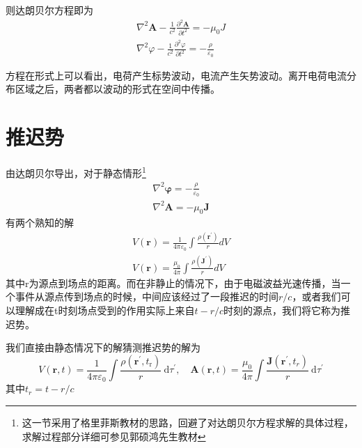         则达朗贝尔方程即为
        \begin{equation}
            \label{eq.5_7}
            \boxed{\begin{gathered}
            \nabla^{2} \boldsymbol{A}-\frac{1}{c^{2}} \frac{\partial^{2} \boldsymbol{A}}{\partial t^{2}}=-\mu_{0} J \\
            \nabla^{2} \varphi-\frac{1}{c^{2}} \frac{\partial^{2} \varphi}{\partial t^{2}}=-\frac{\rho}{\varepsilon_{0}} 
            \end{gathered}}
        \end{equation}
        
        方程在形式上可以看出，电荷产生标势波动，电流产生矢势波动。离开电荷电流分布区域之后，两者都以波动的形式在空间中传播。
\section{推迟势}
    由达朗贝尔导出，对于静态情形\footnote{这一节采用了格里菲斯教材的思路，回避了对达朗贝尔方程求解的具体过程，求解过程部分详细可参见郭硕鸿先生教材}
    \begin{equation}
        \begin{gathered}
            \nabla^2 \boldsymbol{\varphi} = -\frac{\rho}{\varepsilon_0} \\
            \nabla^2 \boldsymbol{\boldsymbol{A}} = -\mu_0 \boldsymbol{J}
        \end{gathered}
    \end{equation}
    有两个熟知的解
    \begin{equation}
        \begin{gathered}
            V(\boldsymbol{r}) = \frac{1}{4 \pi \varepsilon_0} \int \frac{\rho(\boldsymbol{r}^\prime)}{r}dV \\
            V(\boldsymbol{r}) = \frac{\mu_0}{4 \pi} \int \frac{\rho(\boldsymbol{J}^\prime)}{r}dV
        \end{gathered}
    \end{equation}
    其中r为源点到场点的距离。而在非静止的情况下，由于电磁波益光速传播，当一个事件从源点传到场点的时候，中间应该经过了一段推迟的时间$r/c$，或者我们可以理解成在t时刻场点受到的作用实际上来自$t-r/c$时刻的源点，我们将它称为推迟势。

    我们直接由静态情况下的解猜测推迟势的解为
    \begin{equation}
        \boxed{V(\boldsymbol{r}, t)=\frac{1}{4 \pi \varepsilon_{0}} \int \frac{\rho\left(\boldsymbol{r}^{\prime}, t_{\mathrm{r}}\right)}{r} \mathrm{~d} \tau^{\prime}, \quad \boldsymbol{A}(\boldsymbol{r}, t)=\frac{\mu_{0}}{4 \pi} \int \frac{\boldsymbol{J}\left(\boldsymbol{r}^{\prime}, t_{r}\right)}{r} \mathrm{~d} \tau^{\prime}}
    \end{equation}
    其中$t_r=t-r/c$
    
